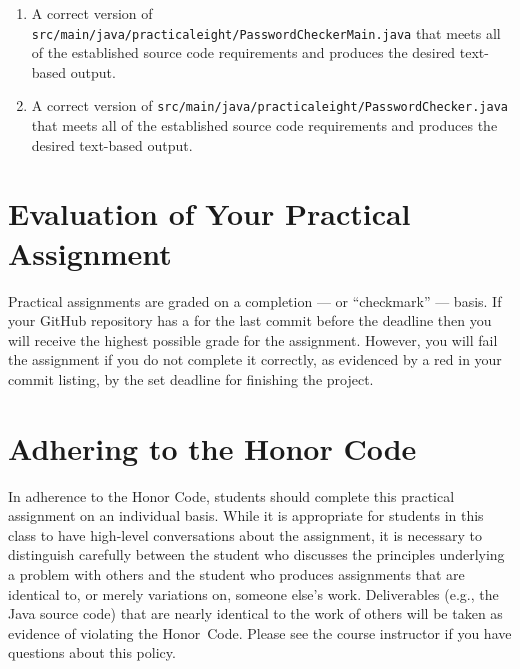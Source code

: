 \documentclass[11pt]{article}
\newcommand{\mainprogramsource}{\lstinline{src/main/java/practicaleight/PasswordCheckerMain.java}}
\newcommand{\secondprogramsource}{\lstinline{src/main/java/practicaleight/PasswordChecker.java}}
\newcommand{\checkmark}{\ding{51}}
\newcommand{\naughtmark}{\ding{55}}
\begin{document}
\begin{enumerate}

\setlength{\itemsep}{0in}

\item A correct version of \mainprogramsource{} that meets all of the
  established source code requirements and produces the desired text-based
  output.

\item A correct version of \secondprogramsource{} that meets all of the
  established source code requirements and produces the desired text-based
  output.

\end{enumerate}

\section*{Evaluation of Your Practical Assignment}

Practical assignments are graded on a completion --- or ``checkmark'' --- basis.
If your GitHub repository has a \checkmark{} for the last commit before the
deadline then you will receive the highest possible grade for the assignment.
However, you will fail the assignment if you do not complete it correctly, as
evidenced by a red \naughtmark{} in your commit listing, by the set deadline for
finishing the project.

\section*{Adhering to the Honor Code}

In adherence to the Honor Code, students should complete this practical
assignment on an individual basis. While it is appropriate for students in this
class to have high-level conversations about the assignment, it is necessary to
distinguish carefully between the student who discusses the principles
underlying a problem with others and the student who produces assignments that
are identical to, or merely variations on, someone else's work. Deliverables
(e.g., the Java source code) that are nearly identical to the work of others
will be taken as evidence of violating the \mbox{Honor Code}. Please see the
course instructor if you have questions about this policy.
\end{document}
